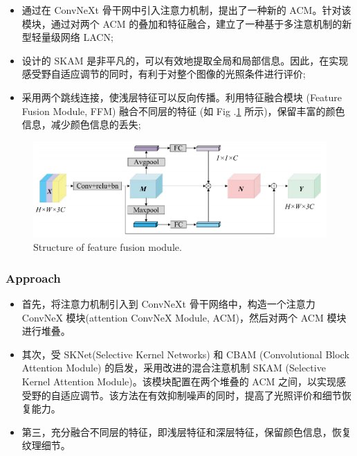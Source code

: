 \documentclass[a4paper, 10pt]{article}
\begin{document}
			\begin{itemize}
				\item[(1)] 
				通过在 ConvNeXt 骨干网中引入注意力机制，提出了一种新的 ACM。针对该模块，通过对两个 ACM 的叠加和特征融合，建立了一种基于多注意机制的新型轻量级网络 LACN;
				
				\item[(2)]
				设计的 SKAM 是非平凡的，可以有效地提取全局和局部信息。因此，在实现感受野自适应调节的同时，有利于对整个图像的光照条件进行评价;
				
				\item[(3)]
				采用两个跳线连接，使浅层特征可以反向传播。利用特征融合模块 (Feature Fusion Module, FFM) 融合不同层的特征 (如 Fig .\ref{fig: FFM structure} 所示)，保留丰富的颜色信息，减少颜色信息的丢失;
			\end{itemize}	
			
			\begin{figure}[htbp]
				\centering 
				\includegraphics[width=0.8\columnwidth]{picture/LLIE/LACN/FFM structure}
				\caption{
					\label{fig: FFM structure} 
					Structure of feature fusion module.
				}
			\end{figure}
			
			
			\subsubsection{Approach}
			
			\begin{itemize}
				\item[(1)] 
				首先，将注意力机制引入到 ConvNeXt 骨干网络中，构造一个注意力 ConvNeX 模块(attention ConvNeX Module, ACM)，然后对两个 ACM 模块进行堆叠。
				
				\item[(2)]
				其次，受 SKNet(Selective Kernel Networks) 和 CBAM (Convolutional Block Attention Module) 的启发，采用改进的混合注意机制 SKAM (Selective Kernel Attention Module)。该模块配置在两个堆叠的 ACM 之间，以实现感受野的自适应调节。该方法在有效抑制噪声的同时，提高了光照评价和细节恢复能力。
				
				\item[(3)]
				第三，充分融合不同层的特征，即浅层特征和深层特征，保留颜色信息，恢复纹理细节。
			\end{itemize}				
			
\end{document}
